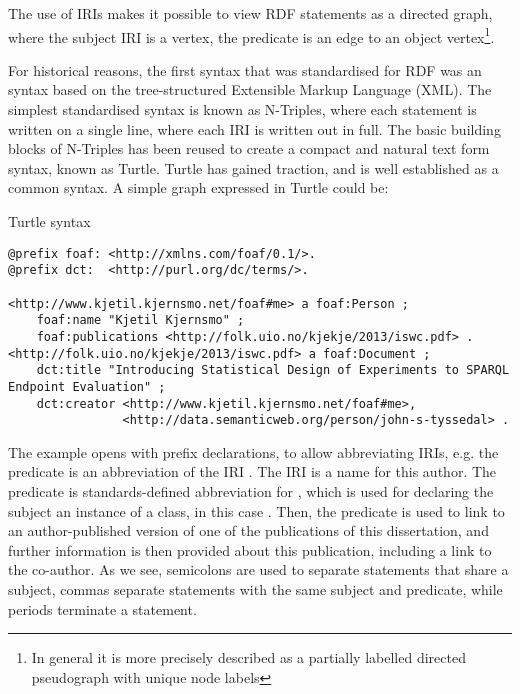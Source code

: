 The use of IRIs makes it possible to view RDF statements as a directed
graph, where the subject IRI is a vertex, the predicate is an edge to
an object vertex\footnote{In general it is more precisely described as a
  partially labelled directed pseudograph with unique node labels}.

For historical reasons, the first syntax that was standardised for RDF
was an syntax based on the tree-structured Extensible Markup Language
(XML). The simplest standardised syntax is known as N-Triples, where
each statement is written on a single line, where each IRI is written
out in full. The basic building blocks of N-Triples has been reused to
create a compact and natural text form syntax, known as Turtle. Turtle
has gained traction, and is well established as a common syntax. A
simple graph expressed in Turtle could be:

\begin{example}{Turtle syntax}\label{ex:turtle}
\begin{verbatim}
@prefix foaf: <http://xmlns.com/foaf/0.1/>.
@prefix dct:  <http://purl.org/dc/terms/>.

<http://www.kjetil.kjernsmo.net/foaf#me> a foaf:Person ;
    foaf:name "Kjetil Kjernsmo" ;
    foaf:publications <http://folk.uio.no/kjekje/2013/iswc.pdf> .
<http://folk.uio.no/kjekje/2013/iswc.pdf> a foaf:Document ;
    dct:title "Introducing Statistical Design of Experiments to SPARQL Endpoint Evaluation" ; 
    dct:creator <http://www.kjetil.kjernsmo.net/foaf#me>, 
                <http://data.semanticweb.org/person/john-s-tyssedal> .
\end{verbatim}
\end{example}

The example opens with prefix declarations, to allow abbreviating
IRIs, e.g. the predicate  is an abbreviation of the
IRI . The IRI
 is a name for this
author. The  predicate is standards-defined abbreviation
for , which
is used for declaring the subject an instance of a class, in this case
. Then, the  predicate
is used to link to an author-published version of one of the
publications of this dissertation, and further information is then
provided about this publication, including a link to the co-author. As
we see, semicolons are used to separate statements that share a
subject, commas separate statements with the same subject and
predicate, while periods terminate a statement. 

